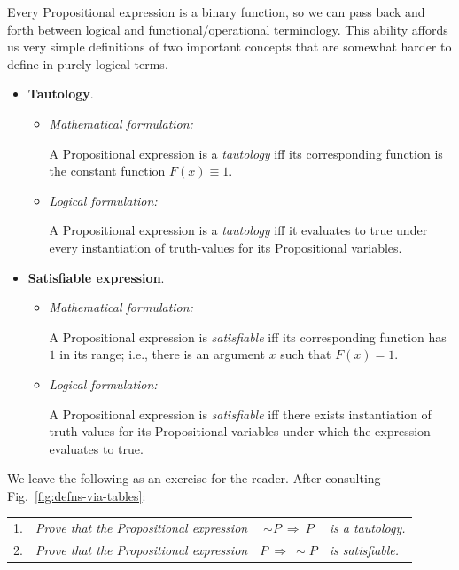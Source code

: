 \medskip

Every Propositional expression is a binary function, so we can pass
back and forth between logical and functional/operational
terminology.  This ability affords us very simple definitions of two
important concepts that are somewhat harder to define in purely logical
terms.
\begin{itemize}
\item
{\bf Tautology}. 
  \begin{itemize}
  \item
{\it Mathematical formulation:}
  
A Propositional expression is a {\it tautology} iff its corresponding
function is the constant function $F(x) \equiv 1$.
  \item
{\it Logical formulation:}
  
A Propositional expression is a {\it tautology} iff it evaluates to
{\sc true} under every instantiation of truth-values for its
Propositional variables.
  \end{itemize}
\item
{\bf Satisfiable expression}. 
  \begin{itemize}
  \item
{\it Mathematical formulation:}

A Propositional expression is {\it satisfiable} iff its corresponding
function has $1$ in its range; i.e., there is an argument $x$ such
that $F(x) = 1$.
  \item
{\it Logical formulation:}

A Propositional expression is {\it satisfiable} iff there exists
instantiation of truth-values for its Propositional variables under
which the expression evaluates to {\sc true}.
  \end{itemize}
\end{itemize}

\noindent
We leave the following as an exercise for the reader.  After
consulting Fig.~\ref{fig:defns-via-tables}:

\begin{tabular}{llcl}
1. &
{\it Prove that the Propositional expression} &
$\sim P \ \Rightarrow \ P$ &
{\it is a tautology.} \\
2. &
{\it Prove that the Propositional expression} &
$P \ \Rightarrow \ \sim P$ &
{\it is satisfiable.}
\end{tabular}

